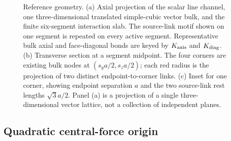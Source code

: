 \documentclass[10pt,aps,pre,reprint,floatfix,notitlepage,nofootinbib]{revtex4-2}
\begin{document}
\begin{figure}[t]
{%
}
\caption{Reference geometry.  (a) Axial projection of the scalar line channel, one three-dimensional translated simple-cubic vector bulk, and the finite six-segment interaction slab.  The source-link motif shown on one segment is repeated on every active segment.  Representative bulk axial and face-diagonal bonds are keyed by $K_{\rm axis}$ and $K_{\rm diag}$.  (b) Transverse section at a segment midpoint.  The four corners are existing bulk nodes at $(s_y a/2,s_z a/2)$; each red radius is the projection of two distinct endpoint-to-corner links.  (c) Inset for one corner, showing endpoint separation $a$ and the two source-link rest lengths $\sqrt3a/2$.  Panel (a) is a projection of a single three-dimensional vector lattice, not a collection of independent planes.}
\label{fig:sectionII_geometry}
\end{figure}

\subsection{Quadratic central-force origin}
\label{sec:s2-harmonic-origin}
\end{document}
